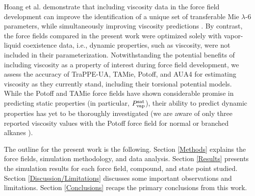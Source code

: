 \documentclass[preprint,review,12pt]{elsarticle}
\begin{document}
    Hoang et al. demonstrate that including viscosity data in the force field development can improve the identification of a unique set of transferable Mie $\lambda$-6 parameters, while simultaneously improving viscosity predictions \cite{Hoang2017}. By contrast, the force fields compared in the present work were optimized solely with vapor-liquid coexistence data, i.e., dynamic properties, such as viscosity, were not included in their parameterization. Notwithstanding the potential benefits of including viscosity as a property of interest during force field development, we assess the accuracy of TraPPE-UA, TAMie, Potoff, and AUA4 for estimating viscosity as they currently stand, including their torsional potential models. While the Potoff and TAMie force fields have shown considerable promise in predicting static properties (in particular, $P_{\rm vap}^{\rm sat}$), their ability to predict dynamic properties has yet to be thoroughly investigated (we are aware of only three reported viscosity values with the Potoff force field for normal or branched alkanes \cite{Ewen2016}).
	
        
    
    The outline for the present work is the following. Section \ref{Methods} explains the force fields, simulation methodology, and data analysis. Section \ref{Results} presents the simulation results for each force field, compound, and state point studied. Section \ref{Discussion/Limitations} discusses some important observations and limitations. Section \ref{Conclusions} recaps the primary conclusions from this work.
    
	
\end{document}
